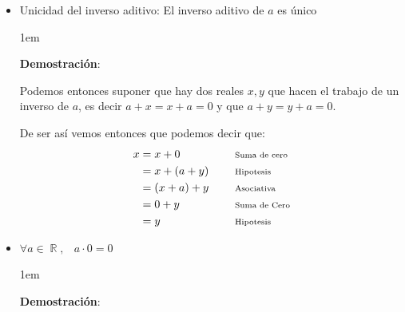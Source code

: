 \documentclass[12pt, fleqn]{report}                             %
\newenvironment{SmallIndentation}[1][0.75em]                    %
        {\begin{adjustwidth}{#1}{}\begin{footnotesize}}             %
        {\end{footnotesize}\end{adjustwidth}}                       %
\DeclareMathOperator \Space     {\quad}                         %
\DeclareMathOperator \MiniSpace {\;}                            %
\newcommand \Remember[1]    {\Space\text{\scriptsize{#1}}}      %
\theoremstyle{break}                                            %
\DeclareMathOperator \Reals        {\mathbb{R}}                 %
\begin{document}
\begin{itemize}
\begin{SmallIndentation}[1em]
                        \end{SmallIndentation}

                    \item Unicidad del inverso aditivo: El inverso aditivo de $a$ es único

                        \begin{SmallIndentation}[1em]
                            \textbf{Demostración}:

                            Podemos entonces suponer que hay dos reales $x, y$ que hacen el 
                            trabajo de un inverso de $a$, es decir
                            $a + x = x + a = 0$ y que 
                            $a + y = y + a = 0$.

                            De ser así vemos entonces que podemos decir que:
                            \begin{align*}
                                x 
                                    &= x + 0          &&\Remember{Suma de cero}   \\
                                    &= x + (a + y)    &&\Remember{Hipotesis}      \\
                                    &= (x + a) + y    &&\Remember{Asociativa}     \\
                                    &= 0 + y          &&\Remember{Suma de Cero}   \\
                                    &= y              &&\Remember{Hipotesis}   
                            \end{align*}

                        \end{SmallIndentation}

                    \clearpage


                    \item $\forall a \in \Reals, \MiniSpace a \cdot 0 = 0$

                        \begin{SmallIndentation}[1em]
                            \textbf{Demostración}:


\end{SmallIndentation}
\end{itemize}
\end{document}
